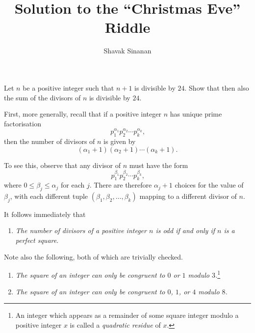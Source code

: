 \documentclass[a4paper,reqno,12pt]{amsart}
\begin{document}
	
\title{Solution to the ``Christmas Eve'' Riddle}
\author{Shavak Sinanan}
	
\maketitle

\begin{problem*}
    Let \(n\) be a positive integer such that \(n + 1\) is divisible by \(24\). Show that then also the sum of the divisors of \(n\) is divisible by \(24\).
\end{problem*}

\begin{soln}
    First, more generally, recall that if a positive integer \(n\) has unique prime factorisation
    \[
    p_1^{\alpha_1} p_2^{\alpha_2} \dotsb p_k^{\alpha_k}\text{,}
    \]
    then the number of divisors of \(n\) is given by
    \[
    (\alpha_1 + 1)(\alpha_2 + 1) \dotsb (\alpha_k + 1)\text{.}
    \]
    
    To see this, observe that any divisor of \(n\) must have the form
    \[
    p_1^{\beta_1} p_2^{\beta_2} \dotsb p_k^{\beta_k}\text{,}
    \]
    where \(0 \leq \beta_j \leq \alpha_j\) for each \(j\). There are therefore \(\alpha_j + 1\) choices for the value of \(\beta_j\), with each different tuple \((\beta_1, \beta_2, \dotsc, \beta_k)\) mapping to a different divisor of \(n\).
    
    It follows immediately that
    \begin{enumerate}[label=\textbf{Fact} \Roman*]
	\item \label{itm:even_number_divisors} \emph{The number of divisors of a positive integer \(n\) is odd if and only if \(n\) is a perfect square}.
    \end{enumerate}
    
    Note also the following, both of which are trivially checked.
    \begin{enumerate}[resume,label=\textbf{Fact} \Roman*]
	\item \label{itm:quadratic_residues_mod3} \emph{The square of an integer can only be congruent to \(0\) or \(1\) modulo \(3\).}\footnote{An integer which appears as a remainder of some square integer modulo a positive integer \(x\) is called a \emph{quadratic residue} of \(x\).}
	\item \label{itm:quadratic_residues_mod8} \emph{The square of an integer can only be congruent to \(0\), \(1\), or \(4\) modulo \(8\).}
    \end{enumerate}
    

\end{soln}
\end{document}
